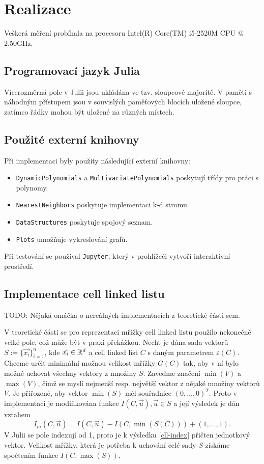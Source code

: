 \chapter{Realizace}

Veškerá měření probíhala na procesoru Intel(R) Core(TM) i5-2520M CPU @ 2.50GHz.

\section{Programovací jazyk Julia}

Vícerozměrná pole v Julii jsou ukládána ve tzv. sloupcové majoritě. V paměti s náhodným přístupem jsou v souvislých paměťových blocích uložené sloupce, zatímco řádky mohou být uložené na různých místech.

\section{Použité externí knihovny}

Při implementaci byly použity následující externí knihovny:
\begin{itemize}
  \item \texttt{DynamicPolynomials} a \texttt{MultivariatePolynomials} poskytují třídy pro práci s polynomy.
  \item \texttt{NearestNeighbors} poskytuje implementaci k-d stromu.
  \item \texttt{DataStructures} poskytuje spojový seznam.
  \item \texttt{Plots} umožňuje vykreslování grafů.
\end{itemize}

Při testování se používal \texttt{Jupyter}, který v prohlížeči vytvoří interaktivní prostředí.

\section{Implementace cell linked listu}

TODO: Nějaká omáčka o nereálných implementacích z teoretické části sem.

V teoretické části se pro reprezentaci mřížky cell linked listu použilo nekonečně velké pole, což může být v praxi překážkou. Nechť je dána sada vektorů $S := \{\vec{x_i}\}_{i=1}^n$, kde $\vec{x_i} \in \mathbb{R}^d$ a cell linked list $C$ s daným parametrem $\varepsilon(C)$. Chceme určit minimální možnou velikost mřížky $G(C)$ tak, aby v ní bylo možné uchovat všechny vektory z množiny $S$. Zaveďme značení $\min(V)$ a $\max(V)$, čímž se myslí nejmenší resp. největší vektor z nějaké množiny vektorů $V$. Je přiřozené, aby vektor $\min(S)$ měl souřadnice $(0, \ldots, 0)^T$. Proto v implementaci je modifikována funkce $I(C, \vec{u}), \vec{u} \in S$ a její výsledek je dán vztahem
\begin{equation}
  \label{cll-index}
  I_m(C, \vec{u}) = I(C, \vec{u}) - I(C, \min(S(C))) + (1, \ldots, 1).
\end{equation}
V Julii se pole indexují od 1, proto je k výsledku \ref{cll-index} přičten jednotkový vektor. Velikost mřížky, která je potřeba k uchování celé sady $S$ získáme spočtením funkce $I(C, \max(S))$.

